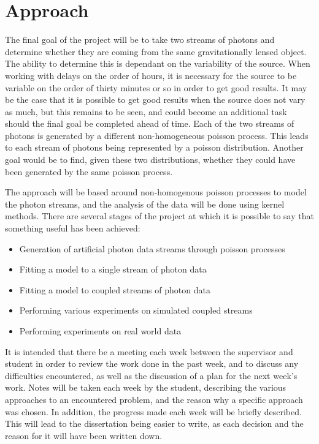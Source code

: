 \documentclass[10pt,a4paper]{article}
\begin{document}
\section*{Approach}
The final goal of the project will be to take two streams of photons and determine whether they are coming from the same gravitationally lensed object. The ability to determine this is dependant on the variability of the source. When working with delays on the order of hours, it is necessary for the source to be variable on the order of thirty minutes or so in order to get good results. It may be the case that it is possible to get good results when the source does not vary as much, but this remains to be seen, and could become an additional task should the final goal be completed ahead of time. Each of the two streams of photons is generated by a different non-homogeneous poisson process. This leads to each stream of photons being represented by a poisson distribution. Another goal would be to find, given these two distributions, whether they could have been generated by the same poisson process.
\par The approach will be based around non-homogenous poisson processes to model the photon streams, and the analysis of the data will be done using kernel methods. There are several stages of the project at which it is possible to say that something useful has been achieved:
\begin{itemize}
  \item Generation of artificial photon data streams through poisson processes
  \item Fitting a model to a single stream of photon data
  \item Fitting a model to coupled streams of photon data
  \item Performing various experiments on simulated coupled streams
  \item Performing experiments on real world data
\end{itemize}
It is intended that there be a meeting each week between the supervisor and student in order to review the work done in the past week, and to discuss any difficulties encountered, as well as the discussion of a plan for the next week's work. Notes will be taken each week by the student, describing the various approaches to an encountered problem, and the reason why a specific approach was chosen. In addition, the progress made each week will be briefly described. This will lead to the dissertation being easier to write, as each decision and the reason for it will have been written down. 
\end{document}
